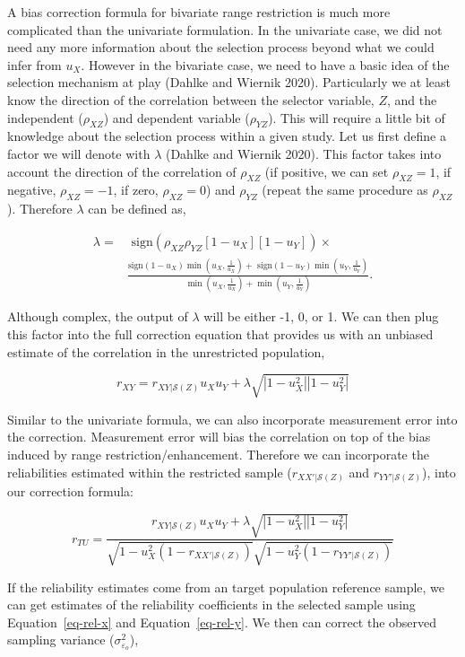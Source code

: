 \documentclass[
  letterpaper,
  DIV=11,
  numbers=noendperiod]{scrreprt}
\begin{document}
A bias correction formula for bivariate range restriction is much more
complicated than the univariate formulation. In the univariate case, we
did not need any more information about the selection process beyond
what we could infer from \(u_X\). However in the bivariate case, we need
to have a basic idea of the selection mechanism at play (Dahlke and
Wiernik 2020). Particularly we at least know the direction of the
correlation between the selector variable, \(Z\), and the independent
(\(\rho_{XZ}\)) and dependent variable (\(\rho_{YZ}\)). This will
require a little bit of knowledge about the selection process within a
given study. Let us first define a factor we will denote with
\(\lambda\) (Dahlke and Wiernik 2020). This factor takes into account
the direction of the correlation of \(\rho_{XZ}\) (if positive, we can
set \(\rho_{XZ}=1\), if negative, \(\rho_{XZ}=-1\), if zero,
\(\rho_{XZ}=0\)) and \(\rho_{YZ}\) (repeat the same procedure as
\(\rho_{XZ}\)). Therefore \(\lambda\) can be defined as,

\[\begin{aligned}
\lambda =& \text{ sign}\left(\rho_{XZ}\rho_{YZ} [1-u_X][1-u_Y]\right)\times \\[.3em] &\frac{\text{sign}
\left(1-u_X\right)\min\left(u_X,\frac{1}{u_X}\right) + 
\text{ sign}\left(1-u_Y\right)\min\left(u_Y,\frac{1}{u_Y}\right)
}{\min\left(u_X,\frac{1}{u_X}\right)+\min\left(u_Y,\frac{1}{u_Y}\right)}.
\end{aligned}\]

Although complex, the output of \(\lambda\) will be either -1, 0, or 1.
We can then plug this factor into the full correction equation that
provides us with an unbiased estimate of the correlation in the
unrestricted population,

\[
r_{XY} = r_{XY|\mathcal{S}(Z)}u_Xu_Y+\lambda\sqrt{|1-u_X^2||1-u_Y^2|}
\]

Similar to the univariate formula, we can also incorporate measurement
error into the correction. Measurement error will bias the correlation
on top of the bias induced by range restriction/enhancement. Therefore
we can incorporate the reliabilities estimated within the restricted
sample (\(r_{XX'|\mathcal{S}(Z)}\) and \(r_{YY'|\mathcal{S}(Z)}\)), into
our correction formula:

\[
r_{TU} = \frac{r_{XY|\mathcal{S}(Z)}u_Xu_Y+\lambda\sqrt{|1-u_X^2||1-u_Y^2|}}{\sqrt{1-u_X^2\left(1-r_{XX'|\mathcal{S}(Z)}\right)}\sqrt{1-u_Y^2\left(1-r_{YY'|\mathcal{S}(Z)}\right)}}
\]

If the reliability estimates come from an target population reference
sample, we can get estimates of the reliability coefficients in the
selected sample using Equation~\ref{eq-rel-x} and
Equation~\ref{eq-rel-y}. We then can correct the observed sampling
variance (\(\sigma^2_{\varepsilon_o}\)),
\end{document}
